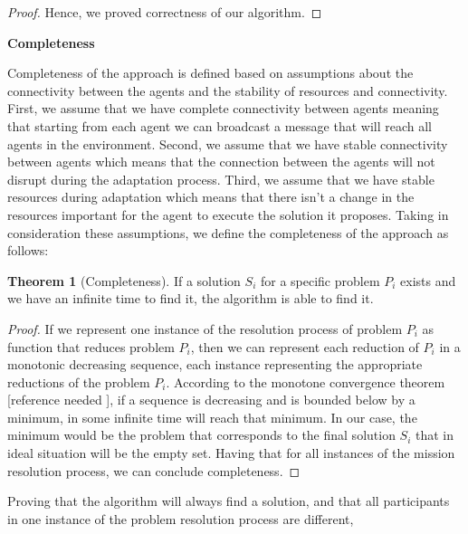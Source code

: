 \documentclass[journal]{IEEEtran}
\theoremstyle{definition}
\newtheorem{theorem}{Theorem}
\newcommand\darko[1]{\nb{Darko}{#1}}
\begin{document}
\begin{proof}

Hence, we proved correctness of our algorithm.

\end{proof}


\textbf{Completeness}

Completeness of the approach is defined based on assumptions about the connectivity between the agents and the stability of resources and connectivity.
First, we assume that we have complete connectivity between agents meaning that starting from each agent we can broadcast a message that will reach all agents in the environment. 
Second, we assume that we have stable connectivity between agents which means that the connection between the agents will not disrupt during the adaptation process. 
Third, we assume that we have stable resources during adaptation which means that there isn’t a change in the resources important for the agent to execute the solution it proposes.
Taking in consideration these assumptions, we define the completeness of the approach as follows:
\begin{theorem}[Completeness]
If a solution $S_i$ for a specific problem $P_i$ exists and we have an infinite time to find it, the algorithm is able to find it.
\end{theorem}
\begin{proof}
If we represent one instance of the resolution process of problem $P_i$ as function that reduces problem $P_i$, then we can represent each reduction of $P_i$ in a monotonic decreasing sequence, each instance representing the appropriate reductions of the problem $P_i$.
According to the monotone convergence theorem [reference needed \darko{Where to find good reference for this}], if a sequence is decreasing and is bounded below by a minimum, in some infinite time will reach that minimum. In our case, the minimum would be the problem that corresponds to the final solution $S_i$ that in ideal situation will be the empty set.
Having that for all instances of the mission resolution process, we can conclude completeness.
\end{proof}


Proving that the algorithm will always find a solution, and that all participants in one instance of the problem resolution process are different, 



\end{document}
